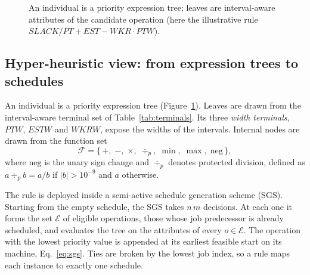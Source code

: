 \documentclass[preprint,number,sort&compress,12pt]{elsarticle}
\begin{document}
\begin{figure}[!t]
\centering
{}
\caption{An individual is a priority expression tree; leaves are
interval-aware attributes of the candidate operation (here the
illustrative rule $\mathit{SLACK}/\mathit{PT} + \mathit{EST} -
\mathit{WKR}\cdot\mathit{PTW}$).}
\label{fig:tree}
\end{figure}

\subsection{Hyper-heuristic view: from expression trees to schedules}
\label{sec:hhview}
An individual is a priority expression tree (Figure~\ref{fig:tree}).
Leaves are drawn from the interval-aware terminal set of
Table~\ref{tab:terminals}. Its three \emph{width terminals},
$\mathit{PTW}$, $\mathit{ESTW}$ and $\mathit{WKRW}$, expose the widths of
the intervals. Internal nodes are drawn from the function set
\begin{equation}
\mathcal{F} = \{\, +,\; -,\; \times,\; \div_p,\; \min,\; \max,\;
\mathrm{neg} \,\},
\end{equation}
where $\mathrm{neg}$ is the unary sign change and $\div_p$ denotes
protected division, defined as $a \div_p b = a/b$ if $|b| > 10^{-9}$ and
$a$ otherwise.

The rule is deployed inside a semi-active schedule generation scheme
(SGS). Starting from the empty schedule, the SGS takes $n\,m$ decisions.
At each one it forms the set $\mathcal{E}$ of eligible operations, those
whose job predecessor is already scheduled, and evaluates the tree on
the attributes of every $o \in \mathcal{E}$. The operation with the
lowest priority value is appended at its earliest feasible start on its
machine, Eq.~\eqref{eq:sgs}. Ties are broken by the lowest job index, so
a rule maps each instance to exactly one schedule.
\end{document}

